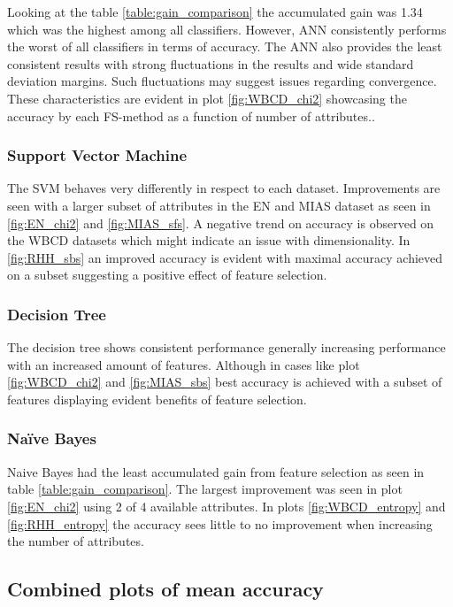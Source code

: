 Looking at the table \ref{table:gain_comparison} the accumulated gain was 1.34 which was the highest among all classifiers. However, ANN consistently performs the worst of all classifiers in terms of accuracy. The ANN also provides the least consistent results with strong fluctuations in the results and wide standard deviation margins. Such fluctuations may suggest issues regarding convergence. These characteristics are evident in plot \ref{fig:WBCD_chi2} showcasing the accuracy by each FS-method as a function of number of attributes..

\subsubsection{Support Vector Machine}

The SVM behaves very differently in respect to each dataset. Improvements are seen with a larger subset of attributes in the EN and MIAS dataset as seen in \ref{fig:EN_chi2} and \ref{fig:MIAS_sfs}. A negative trend on accuracy is observed on the WBCD datasets which might indicate an issue with dimensionality. In \ref{fig:RHH_sbs} an improved accuracy is evident with maximal accuracy achieved on a subset suggesting a positive effect of feature selection.

\subsubsection{Decision Tree}

The decision tree shows consistent performance generally increasing performance with an increased amount of features. Although in cases like plot \ref{fig:WBCD_chi2} and \ref{fig:MIAS_sbs} best accuracy is achieved with a subset of features displaying evident benefits of feature selection.

\subsubsection{Naïve Bayes}

Naive Bayes had the least accumulated gain from feature selection as seen in table \ref{table:gain_comparison}. The largest improvement was seen in plot \ref{fig:EN_chi2} using 2 of 4 available attributes. In plots \ref{fig:WBCD_entropy} and \ref{fig:RHH_entropy} the accuracy sees little to no improvement when increasing the number of attributes.

\subsection{Combined plots of mean accuracy}






